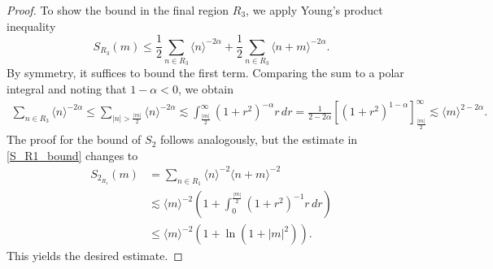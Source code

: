 \begin{proof}
    To show the bound in the final region $R_3$, we apply Young's product inequality
    \begin{equation*}
        S_{R_3}(m) \le \frac{1}{2} \sum_{n \in R_3}\langle n \rangle^{-2\alpha} + \frac{1}{2} \sum_{n \in R_3}\langle n+m \rangle^{-2\alpha}.
    \end{equation*}
    By symmetry, it suffices to bound the first term. Comparing the sum to a polar integral and noting that $1 - \alpha < 0$, we obtain
    \begin{align*}
        \sum_{n \in R_3} \langle n \rangle^{-2\alpha} 
        \le \sum_{|n| > \frac{|m|}{2}} \langle n \rangle^{-2\alpha} 
        \lesssim \int_{\frac{|m|}{2}}^\infty (1+r^2)^{-\alpha} r \, dr 
        = \frac{1}{2 - 2\alpha} \left[ (1+r^2)^{1-\alpha} \right]_{\frac{|m|}{2}}^\infty 
        \lesssim \langle m \rangle^{2-2\alpha}.
    \end{align*}
    The proof for the bound of $S_2$ follows analogously, but the estimate in \eqref{S_R1_bound} changes to 
    \begin{align*}
        S_{2_{R_1}}(m) &= \sum_{n \in R_1} \langle n \rangle^{-2}\langle n+m \rangle^{-2} 
        \\
        &\lesssim \langle m \rangle^{-2} \left(1+ \int_0^{\frac{|m|}{2}} (1 + r^2)^{-1} r \, dr \right)
        \\
&\leq \langle m \rangle^{-2}
    \left(1+\ln(1+|m|^2)\right).
    \end{align*}
    This yields the desired estimate.
\end{proof}


